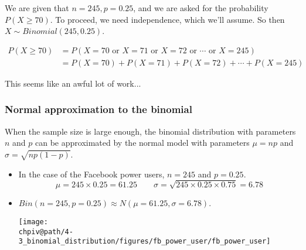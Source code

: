 \documentclass[slidestop,compress,mathserif]{beamer}
\makeatletter
\def\chpiv@path{../../Chp 4}
\makeatother
\begin{document}


\begin{frame}
\frametitle{}


We are given that $n = 245, p = 0.25$, and we are asked for the probability $P(X \ge 70)$. To proceed, we need independence, which we'll assume. So then $X\sim Binomial(245,0.25)$.

\pause

\begin{align*}
P(X \ge 70) &= P(X = 70\text{ or }X = 71\text{ or }X = 72\text{ or }\cdots\text{ or } X = 245) \\
&= P(X = 70) + P(X = 71) + P(X = 72) + \cdots + P(X = 245)
\end{align*}

\pause

This seems like an awful lot of work...

\end{frame}


\begin{frame}
\frametitle{Normal approximation to the binomial}

When the sample size is large enough, the binomial distribution with parameters $n$ and $p$ can be approximated by the normal model with parameters $\mu = np$ and $\sigma = \sqrt{np(1-p)}$.

\begin{itemize}

\item In the case of the Facebook power users, $n = 245$ and $p = 0.25$.
\[ \mu = 245 \times 0.25 = 61.25 \qquad \sigma = \sqrt{245 \times 0.25 \times 0.75} = 6.78 \]

\item $Bin(n = 245, p = 0.25) \approx N(\mu = 61.25, \sigma = 6.78)$.

\begin{center}
\texttt{[image: \\chpiv@path/4-3\_binomial\_distribution/figures/fb\_power\_user/fb\_power\_user]}
\end{center}

\end{itemize}

\end{frame}
\end{document}
